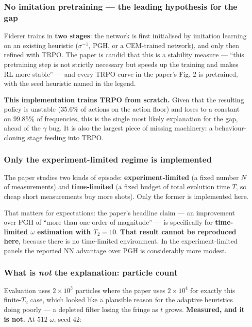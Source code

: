 \documentclass[12pt,a4paper]{article}
\begin{document}
\subsubsection{No imitation pretraining --- the leading hypothesis for the gap}\label{sec:no-imitation-pretraining--the-leading-hypothesis-for-the-gap}
Fiderer trains in \textbf{two stages}: the network is first initialised by imitation learning on an existing heuristic ($\sigma^{-1}$, PGH, or a CEM-trained network), and only then refined with TRPO. The paper is candid that this is a stability measure --- ``this pretraining step is not strictly necessary but speeds up the training and makes RL more stable'' --- and every TRPO curve in the paper's Fig. 2 is pretrained, with the seed heuristic named in the legend.

\textbf{This implementation trains TRPO from scratch.} Given that the resulting policy is unstable (35.6\% of actions on the action floor) and loses to a constant on 99.85\% of frequencies, this is the single most likely explanation for the gap, ahead of the $\gamma$ bug. It is also the largest piece of missing machinery: a behaviour-cloning stage feeding into TRPO.

\subsubsection{Only the experiment-limited regime is implemented}\label{sec:only-the-experiment-limited-regime-is-implemented}
The paper studies two kinds of episode: \textbf{experiment-limited} (a fixed number $N$ of measurements) and \textbf{time-limited} (a fixed budget of total evolution time $T$, so cheap short measurements buy more shots). Only the former is implemented here.

That matters for expectations: the paper's headline claim --- an improvement over PGH of ``more than one order of magnitude'' --- is specifically for \textbf{time-limited $\omega$ estimation with $T_2 = 10$}. \textbf{That result cannot be reproduced here}, because there is no time-limited environment. In the experiment-limited panels the reported NN advantage over PGH is considerably more modest.

\subsubsection{What is \emph{not} the explanation: particle count}\label{sec:what-is-not-the-explanation-particle-count}
Evaluation uses $2\times10^3$ particles where the paper uses $2\times10^4$ for exactly this finite-$T_2$ case, which looked like a plausible reason for the adaptive heuristics doing poorly --- a depleted filter losing the fringe as $t$ grows. \textbf{Measured, and it is not.} At 512 $\omega$, seed 42:
\end{document}
